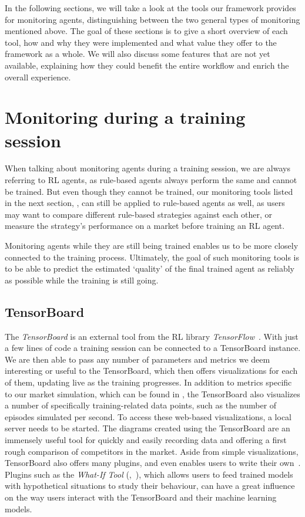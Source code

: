 In the following sections, we will take a look at the tools our framework provides for monitoring agents, distinguishing between the two general types of monitoring mentioned above. The goal of these sections is to give a short overview of each tool, how and why they were implemented and what value they offer to the framework as a whole. We will also discuss some features that are not yet available, explaining how they could benefit the entire workflow and enrich the overall experience.

\section{Monitoring during a training session}

When talking about monitoring agents during a training session, we are always referring to RL agents, as rule-based agents always perform the same and cannot be trained. But even though they cannot be trained, our monitoring tools listed in the next section, , can still be applied to rule-based agents as well, as users may want to compare different rule-based strategies against each other, or measure the strategy's performance on a market before training an RL agent.

Monitoring agents while they are still being trained enables us to be more closely connected to the training process. Ultimately, the goal of such monitoring tools is to be able to predict the estimated `quality' of the final trained agent as reliably as possible while the training is still going.

\subsection{TensorBoard}\label{subsec:TensorBoard}

The \emph{TensorBoard} is an external tool from the RL library \emph{TensorFlow}~\cite{TensorFlow}. With just a few lines of code a training session can be connected to a TensorBoard instance. We are then able to pass any number of parameters and metrics we deem interesting or useful to the TensorBoard, which then offers visualizations for each of them, updating live as the training progresses. In addition to metrics specific to our market simulation, which can be found in , the TensorBoard also visualizes a number of specifically training-related data points, such as the number of episodes simulated per second. To access these web-based visualizations, a local server needs to be started. The diagrams created using the TensorBoard are an immensely useful tool for quickly and easily recording data and offering a first rough comparison of competitors in the market. Aside from simple visualizations, TensorBoard also offers many plugins, and even enables users to write their own~\cite{TensorBoardPlugins}. Plugins such as the \emph{What-If Tool} (\cite{WhatIfTool},~\cite{WhatIfToolWeb}), which allows users to feed trained models with hypothetical situations to study their behaviour, can have a great influence on the way users interact with the TensorBoard and their machine learning models.

